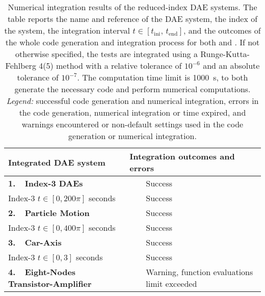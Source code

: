 \setlength\tabcolsep{2.5pt}
\setlength{\LTcapwidth}{\textwidth}
{\footnotesize\centering\begin{longtable}{lccl}
  \caption[
    Numerical integration results of the reduced-index \ac{DAE} systems.
  ]{
    Numerical integration results of the reduced-index \ac{DAE} systems. The table reports the name and reference of the \ac{DAE} system, the index of the system, the integration interval $t \in [t_{\text{ini}}, \, t_{\text{end}}]$, and the outcomes of the whole code generation and integration process for both \Maple{} and \Indigo{}. If not otherwise specified, the tests are integrated using a Runge-Kutta-Fehlberg 4(5) method with a relative tolerance of $10^{-6}$ and an absolute tolerance of $10^{-7}$. The computation time limit is \SI{1000}{\second}, to both generate the necessary code and perform numerical computations. \emph{Legend:} \mycheckmark{} successful code generation and numerical integration, \mycrossmark{} errors in the code generation, numerical integration or time expired, and \mywarnmark{} warnings encountered or non-default settings used in the code generation or numerical integration.
  }
  \label{chap6:tab:numerical_integration}
  \endfirsthead
  \endhead
  \toprule
  \textbf{Integrated \ac{DAE} system} &
  \multicolumn{3}{l}{\textbf{Integration outcomes and errors}} \\
  \midrule
  \multirow{1}{*}{\textbf{1.~~Index-3 \acp{DAE}~\cite{mathematica}}}
    & \Maple{}  & \mycheckmark{}\phantom{\mywarnmark{}} & Success \\ \cmidrule(l{4pt}){2-4}
    Index-3 \quad $t \in [0, 200\pi]$ seconds & \Indigo{} & \mycheckmark{}\phantom{\mywarnmark{}} & Success \\ \midrule
  \multirow{1}{*}{\textbf{2.~~Particle Motion~\cite{campbell1995index}}}
    & \Maple{}  & \mycheckmark{}\phantom{\mywarnmark{}} & Success \\ \cmidrule(l{4pt}){2-4}
    Index-3 \quad $t \in [0, 400\pi]$ seconds & \Indigo{} & \mycheckmark{}\phantom{\mywarnmark{}} & Success \\ \midrule
  \multirow{1}{*}{\textbf{3.~~Car-Axis~\cite{lioen1998test, mazzia2008test}}}
    & \Maple{}  & \mycheckmark{}\phantom{\mywarnmark{}} & Success \\ \cmidrule(l{4pt}){2-4}
    Index-3 \quad $t \in [0, 3]$ seconds & \Indigo{} & \mycheckmark{}\phantom{\mywarnmark{}} & Success \\ \midrule
  \multirow{1}{*}{\textbf{4.~~Eight-Nodes Transistor-Amplifier~\cite{lioen1998test, mazzia2008test}}}
    & \Maple{}  & \mycheckmark{}\mywarnmark{} & Warning, function evaluations limit exceeded \\ \cmidrule(l{4pt}){2-4}

\end{longtable}}
